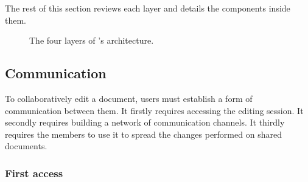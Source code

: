 
The rest of this section reviews each layer and details the components inside
them.

\begin{figure}
  \centering
  
  \caption{\label{fig:architecture}The four layers of \CRATE's architecture.}
\end{figure}

\subsection{Communication}
\label{subsec:communication}

To collaboratively edit a document, users must establish a form of communication
between them. It firstly requires accessing the editing session. It secondly
requires building a network of communication channels. It thirdly requires the
members to use it to spread the changes performed on shared documents.  

\subsubsection{First access}

